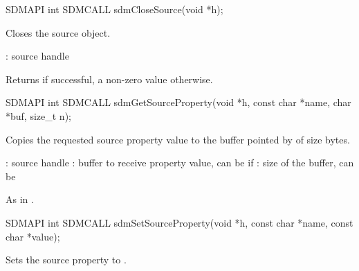 \documentclass[a4paper,12pt,twoside,extrafontsizes]{memoir}
\begin{document}
\begin{cfuncprototype}
SDMAPI int SDMCALL sdmCloseSource(void *h);
\end{cfuncprototype}

\begin{funcdescr}
	Closes the source object.
\end{funcdescr}

\begin{funcparams}
	: source handle
\end{funcparams}

\begin{funcret}
	Returns  if successful, a non-zero value otherwise.
\end{funcret}



\begin{cfuncprototype}
SDMAPI int SDMCALL sdmGetSourceProperty(void *h, const char *name, char *buf, size_t n);
\end{cfuncprototype}

\begin{funcdescr}
	Copies the requested source property value to the buffer pointed by  of size  bytes.
\end{funcdescr}

\begin{funcparams}
	: source handle
	: buffer to receive property value, can be  if 
	: size of the buffer, can be 
\end{funcparams}

\begin{funcret}
	As in .
\end{funcret}



\begin{cfuncprototype}
SDMAPI int SDMCALL sdmSetSourceProperty(void *h, const char *name, const char *value);
\end{cfuncprototype}

\begin{funcdescr}
	Sets the source property  to .
\end{funcdescr}
\end{document}

